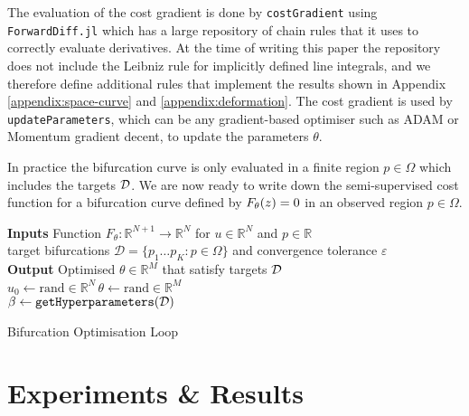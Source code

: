 The evaluation of the cost gradient is done by \texttt{costGradient} using \texttt{ForwardDiff.jl} \cite{Revels2016Forward-ModeJulia} which has a large repository of chain rules that it uses to correctly evaluate derivatives. At the time of writing this paper the repository does not include the Leibniz rule \cite{Flanders1973DifferentiationSign} for implicitly defined line integrals, and we therefore define additional rules that implement the results shown in Appendix \ref{appendix:space-curve} and \ref{appendix:deformation}. The cost gradient is used by \texttt{updateParameters}, which can be any gradient-based optimiser such as ADAM or Momentum gradient decent, to update the parameters $\theta$.

In practice the bifurcation curve is only evaluated in a finite region $p\in\Omega$ which includes the targets $\mathcal{D}$. We are now ready to write down the semi-supervised cost function for a bifurcation curve defined by $F_{\theta}(z)=0$ in an observed region $p\in\Omega$.

\begin{algorithm*}[H]
\label{alg:optimisation-loop}
\SetAlgoLined
\textbf{Inputs} Function $F_{\theta}:\mathbb{R}^{N+1}\rightarrow\mathbb{R}^{N}$ for $u\in\mathbb{R}^N$ and $p\in\mathbb{R}$\\ target bifurcations $\mathcal{D}=\{p_1\dots p_K:p\in\Omega\}$ and convergence tolerance $\varepsilon$\\
\textbf{Output} Optimised $\theta\in\mathbb{R}^M$ that satisfy targets $\mathcal{D}$\\
$u_0\leftarrow\mathrm{rand}\in\mathbb{R}^{N}$\quad\,$\theta\leftarrow\mathrm{rand}\in\mathbb{R}^{M}$\\
$\beta\leftarrow\texttt{getHyperparameters}(\mathcal{D})$\\
\caption{Bifurcation Optimisation Loop}
\end{algorithm*}

\section{Experiments \& Results}

